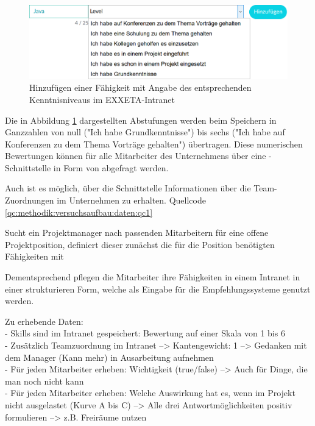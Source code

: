 \begin{figure}[h]
	\centering
	\includegraphics[width=1\textwidth]{gfx/skill-level.png}
	\caption{Hinzufügen einer Fähigkeit mit Angabe des entsprechenden Kenntnisniveaus im EXXETA-Intranet}
	\label{fig:methodik:versuchsaufbau:daten:abb1}
\end{figure}

Die in Abbildung \ref{fig:methodik:versuchsaufbau:daten:abb1} dargestellten Abstufungen werden beim Speichern in Ganzzahlen von null ("Ich habe Grundkenntnisse") bis sechs ("Ich habe auf Konferenzen zu dem Thema Vorträge gehalten") übertragen. Diese numerischen Bewertungen können für alle Mitarbeiter des Unternehmens über eine -Schnittstelle in Form von  abgefragt werden.

Auch ist es möglich, über die Schnittstelle Informationen über die Team-Zuordnungen im Unternehmen zu erhalten. Quellcode \ref{qc:methodik:versuchsaufbau:daten:qc1}

\begin{minipage}{\linewidth}

\end{minipage}

\newpage
Sucht ein Projektmanager nach passenden Mitarbeitern für eine offene Projektposition, definiert dieser zunächst die für die Position benötigten Fähigkeiten mit

Dementsprechend pflegen die Mitarbeiter ihre Fähigkeiten in einem Intranet in einer strukturieren Form, welche als Eingabe für die Empfehlungssysteme genutzt werden.

Zu erhebende Daten:\\
- Skills sind im Intranet gespeichert: Bewertung auf einer Skala von 1 bis 6\\
- Zusätzlich Teamzuordnung im Intranet --> Kantengewicht: 1 --> Gedanken mit dem Manager (Kann mehr) in Ausarbeitung aufnehmen\\
- Für jeden Mitarbeiter erheben: Wichtigkeit (true/false) --> Auch für Dinge, die man noch nicht kann\\
- Für jeden Mitarbeiter erheben: Welche Auswirkung hat es, wenn im Projekt nicht ausgelastet (Kurve A bis C) --> Alle drei Antwortmöglichkeiten positiv formulieren --> z.B. Freiräume nutzen

